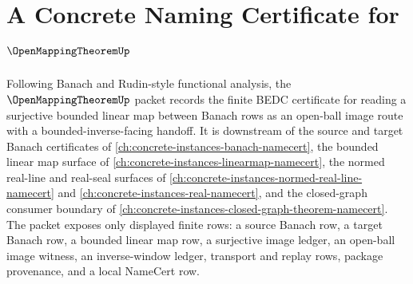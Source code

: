 \chapter{A Concrete Naming Certificate for $\OpenMappingTheoremUp$}
\label{ch:concrete-instances-open-mapping-theorem-namecert}

Following Banach and Rudin-style functional analysis, the $\OpenMappingTheoremUp$ packet records the finite BEDC certificate for reading a surjective bounded linear map between Banach rows as an open-ball image route with a bounded-inverse-facing handoff. It is downstream of the source and target Banach certificates of \autoref{ch:concrete-instances-banach-namecert}, the bounded linear map surface of \autoref{ch:concrete-instances-linearmap-namecert}, the normed real-line and real-seal surfaces of \autoref{ch:concrete-instances-normed-real-line-namecert} and \autoref{ch:concrete-instances-real-namecert}, and the closed-graph consumer boundary of \autoref{ch:concrete-instances-closed-graph-theorem-namecert}. The packet exposes only displayed finite rows: a source Banach row, a target Banach row, a bounded linear map row, a surjective image ledger, an open-ball image witness, an inverse-window ledger, transport and replay rows, package provenance, and a local NameCert row.


